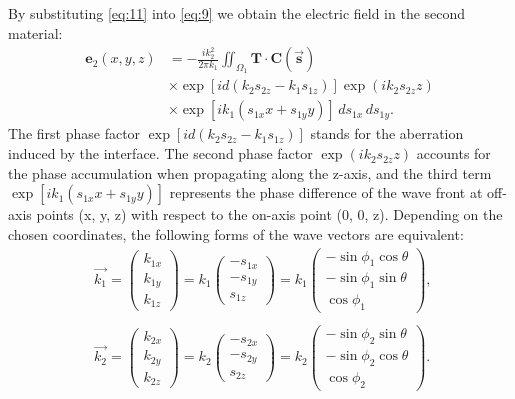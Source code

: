 \documentclass[9pt,twocolumn,twoside]{osajnl}
\begin{document}
By substituting \eqref{eq:11} into \eqref{eq:9} we obtain the electric field in the second material:
\begin{equation}
	\begin{aligned}\label{eq:12}
	\mathbf{e}_2(x,y,z)&=-\frac{ik^2_2}{2\pi k_1}\iint_{\Omega_1}\mathbf{T}\cdot\mathbf{C}(\vec{\mathbf{s}})\\
	&\times\exp[id(k_2s_{2z}-k_1s_{1z})]\exp(ik_2s_{2z}z)\\
	&\times\exp[ik_1(s_{1x}x+s_{1y}y)]\,ds_{1x}\,ds_{1y}.
	\end{aligned}
\end{equation}
The first phase factor $\exp[id(k_2s_{2z}-k_1s_{1z})]$ stands for the aberration induced by the interface. The second phase factor $\exp(ik_2s_{2z}z)$ accounts for the phase accumulation when propagating along the z-axis, and the third term $\exp[ik_1(s_{1x}x+s_{1y}y)]$ represents the phase difference of the wave front at off-axis points (x, y, z) with respect to the on-axis point (0, 0, z).
Depending on the chosen coordinates, the following forms of the wave vectors are equivalent:
\begin{equation}\label{eq:13}
	\begin{aligned}
		&\vec{k_1}=\begin{pmatrix}
			k_{1x}\\
			k_{1y}\\
			k_{1z}
		\end{pmatrix}=k_1	
		\begin{pmatrix}
			-s_{1x}\\
			-s_{1y}\\
			s_{1z}	
		\end{pmatrix}=k_1
		\begin{pmatrix}
			-\sin\phi_1\cos\theta\\
			-\sin\phi_1\sin\theta\\
			\cos\phi_1	
		\end{pmatrix},\,\,\\\\
	&\vec{k_2}=\begin{pmatrix}
		k_{2x}\\
		k_{2y}\\
		k_{2z}
	\end{pmatrix}=k_2	
		\begin{pmatrix}
			-s_{2x}\\
			-s_{2y}\\
			s_{2z}	
		\end{pmatrix}=k_2
		\begin{pmatrix}
			-\sin\phi_2\sin\theta\\
			-\sin\phi_2\cos\theta\\
			\cos\phi_2	
		\end{pmatrix}.		
	\end{aligned}
\end{equation}
\end{document}
